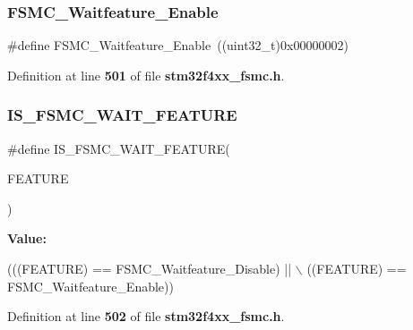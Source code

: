 \subsubsection{F\+S\+M\+C\+\_\+\+Waitfeature\+\_\+\+Enable}
{\footnotesize\ttfamily \#define F\+S\+M\+C\+\_\+\+Waitfeature\+\_\+\+Enable~((uint32\+\_\+t)0x00000002)}



Definition at line \textbf{ 501} of file \textbf{ stm32f4xx\+\_\+fsmc.\+h}.

\mbox{\label{group__FSMC__Wait__feature_ga07c2585b517df2c7afbe3ba16c22f236}} 
\subsubsection{I\+S\+\_\+\+F\+S\+M\+C\+\_\+\+W\+A\+I\+T\+\_\+\+F\+E\+A\+T\+U\+RE}
{\footnotesize\ttfamily \#define I\+S\+\_\+\+F\+S\+M\+C\+\_\+\+W\+A\+I\+T\+\_\+\+F\+E\+A\+T\+U\+RE(\begin{DoxyParamCaption}\item[{}]{F\+E\+A\+T\+U\+RE }\end{DoxyParamCaption})}

{\bfseries Value\+:}
\begin{DoxyCode}
(((FEATURE) == FSMC_Waitfeature_Disable) || \(\backslash\)
                                       ((FEATURE) == FSMC_Waitfeature_Enable))
\end{DoxyCode}


Definition at line \textbf{ 502} of file \textbf{ stm32f4xx\+\_\+fsmc.\+h}.

